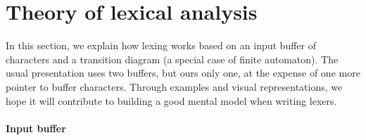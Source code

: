 \documentclass[12pt,a4paper]{article}
\begin{document}
\section{Theory of lexical analysis}

In this section, we explain how lexing works based on an input buffer
of characters and a transition diagram (a special case of finite
automaton). The usual presentation uses two buffers, but ours only
one, at the expense of one more pointer to buffer characters. Through
examples and visual representations, we hope it will contribute to
building a good mental model when writing lexers.

\paragraph{Input buffer}
\end{document}
